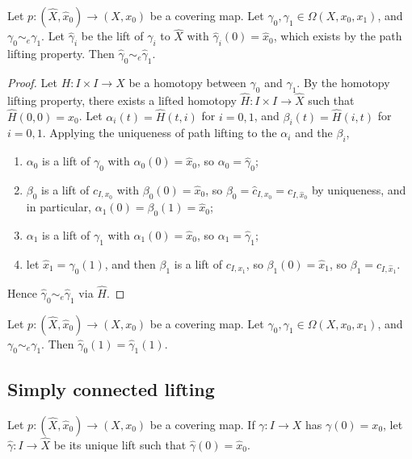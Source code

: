 \begin{proposition}
	Let \( p \colon (\hat X, \hat x_0) \to (X, x_0) \) be a covering map.
	Let \( \gamma_0, \gamma_1 \in \Omega(X,x_0,x_1) \), and \( \gamma_0 \sim_e \gamma_1 \).
	Let \( \hat\gamma_i \) be the lift of \( \gamma_i \) to \( \hat X \) with \( \hat\gamma_i(0) = \hat x_0 \), which exists by the path lifting property.
	Then \( \hat\gamma_0 \sim_e \hat\gamma_1 \).
\end{proposition}
\begin{proof}
	Let \( H \colon I \times I \to X \) be a homotopy between \( \gamma_0 \) and \( \gamma_1 \).
	By the homotopy lifting property, there exists a lifted homotopy \( \hat H \colon I \times I \to \hat X \) such that \( \hat H(0,0) = \hat x_0 \).
	Let \( \alpha_i(t) = \hat H(t,i) \) for \( i = 0, 1 \), and \( \beta_i(t) = \hat H(i,t) \) for \( i = 0, 1 \).
	Applying the uniqueness of path lifting to the \( \alpha_i \) and the \( \beta_i \),
	\begin{enumerate}
		\item \( \alpha_0 \) is a lift of \( \gamma_0 \) with \( \alpha_0(0) = \hat x_0 \), so \( \alpha_0 = \hat\gamma_0 \);
		\item \( \beta_0 \) is a lift of \( c_{I,x_0} \) with \( \beta_0(0) = \hat x_0 \), so \( \beta_0 = \hat c_{I,x_0} = c_{I,\hat x_0} \) by uniqueness, and in particular, \( \alpha_1(0) = \beta_0(1) = \hat x_0 \);
		\item \( \alpha_1 \) is a lift of \( \gamma_1 \) with \( \alpha_1(0) = \hat x_0 \), so \( \alpha_1 = \hat\gamma_1 \);
		\item let \( \hat x_1 = \hat \gamma_0(1) \), and then \( \beta_1 \) is a lift of \( c_{I,x_1} \), so \( \beta_1(0) = \hat x_1 \), so \( \beta_1 = c_{I,\hat x_1} \).
	\end{enumerate}
	Hence \( \hat \gamma_0 \sim_e \hat \gamma_1 \) via \( \hat H \).
\end{proof}
\begin{corollary}
	Let \( p \colon (\hat X, \hat x_0) \to (X, x_0) \) be a covering map.
	Let \( \gamma_0, \gamma_1 \in \Omega(X,x_0,x_1) \), and \( \gamma_0 \sim_e \gamma_1 \).
	Then \( \hat \gamma_0(1) = \hat \gamma_1(1) \).
\end{corollary}

\subsection{Simply connected lifting}
Let \( p \colon (\hat X, \hat x_0) \to (X, x_0) \) be a covering map.
If \( \gamma \colon I \to X \) has \( \gamma(0) = x_0 \), let \( \hat \gamma \colon I \to \hat X \) be its unique lift such that \( \hat \gamma(0) = \hat x_0 \).

